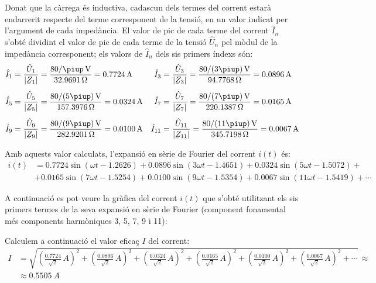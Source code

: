 \begin{exemple}
    Donat que la càrrega és inductiva, cadascun dels
    termes del corrent estarà endarrerit respecte del terme corresponent
    de la tensió, en un valor indicat per l'argument de cada impedància.
    El valor de pic de cada terme del corrent $\hat{I}_n$ s'obté
    dividint el valor de pic de cada terme de la tensió $\hat{U}_n$ pel
    mòdul de la impedància corresponent; els valors de $\hat{I}_n$ dels sis primers índexs són:
    \begin{align*}
        \hat{I}_1 &= \frac{\hat{U}_1}{|\cmplx{Z}_1|} = \frac{80/\piup\si{\,V}}{\SI{32,9691}{\ohm}} = \SI{0,7724}{A}
        & \hat{I}_3 &= \frac{\hat{U}_3}{|\cmplx{Z}_3|} =\frac{80/(3\piup)\si{\,V}}{\SI{94,7768}{\ohm}} = \SI{0,0896}{A}\\[1ex]
        \hat{I}_5 &= \frac{\hat{U}_5}{|\cmplx{Z}_5|} =\frac{80/(5\piup)\si{\,V}}{\SI{157,3976}{\ohm}} =\SI{0,0324}{A}
        & \hat{I}_7 &= \frac{\hat{U}_7}{|\cmplx{Z}_7|} =\frac{80/(7\piup)\si{\,V}}{\SI{220,1387}{\ohm}} =
        \SI{0,0165}{A}\\[1ex]
        \hat{I}_9 &= \frac{\hat{U}_9}{|\cmplx{Z}_9|} =\frac{80/(9\piup)\si{\,V}}{\SI{282,9201}{\ohm}} =
        \SI{0,0100}{A} & \hat{I}_{11} &= \frac{\hat{U}_{11}}{|\cmplx{Z}_{11}|} =\frac{80/(11\piup)\si{\,V}}
        {\SI{345,7198}{\ohm}} =  \SI{0,0067}{A}
    \end{align*}

    Amb aquests valor calculats, l'expansió en sèrie de Fourier del
    corrent $i(t)$ és:
    \[\begin{split}
         i(t) &=  \num{0,7724} \sin(\omega t - \num{1,2626}) +  \num{0,0896} \sin(3 \omega t -
         \num{1,4651}) + \num{0,0324} \sin(5 \omega t - \num{1,5072}) +{}\\
         &+ \num{0,0165} \sin(7 \omega t - \num{1,5254}) + \num{0,0100} \sin(9 \omega t - \num{1,5354})
         + \num{0,0067} \sin(11 \omega t - \num{1,5419}) +\cdots
    \end{split}\]

    A continuació es pot veure la gràfica del corrent $i(t)$ que
    s'obté utilitzant els sis primers termes de la seva expansió en
    sèrie de Fourier (component fonamental més components harmòniques 3, 5, 7, 9 i 11):

    \begin{center}
      
    \end{center}

    Calculem a continuació el valor eficaç $I$ del corrent:
    \[\begin{split}
        I &= \sqrt{\left(\tfrac{\num{0,7724}}{\sqrt{2}}\si{\,A}\right)^2 +
            \left(\tfrac{\num{0,0896}}{\sqrt{2}}\si{\,A}\right)^2 +
            \left(\tfrac{\num{0,0324}}{\sqrt{2}}\si{\,A}\right)^2 +
            \left(\tfrac{\num{0,0165}}{\sqrt{2}}\si{\,A}\right)^2 +
            \left(\tfrac{\num{0,0100}}{\sqrt{2}}\si{\,A}\right)^2 +
            \left(\tfrac{\num{0,0067}}{\sqrt{2}}\si{\,A}\right)^2 + \cdots}
            \,\approx \\[1ex]
            &\approx \SI{0,5505}{A}
    \end{split}\]


\end{exemple}
